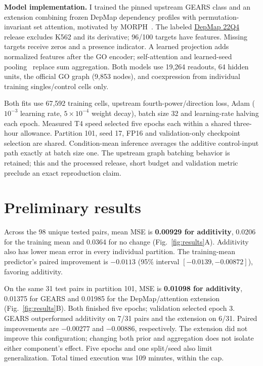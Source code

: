 \documentclass[11pt,letterpaper]{article}
\begin{document}
\textbf{Model implementation.} I trained the pinned upstream GEARS class and an extension combining frozen DepMap dependency profiles with permutation-invariant set attention, motivated by MORPH~\cite{he2025}. The labeled \href{https://doi.org/10.6084/m9.figshare.21637199}{DepMap 22Q4} release excludes K562 and its derivative; 96/100 targets have features. Missing targets receive zeros and a presence indicator. A learned projection adds normalized features after the GO encoder; self-attention and learned-seed pooling~\cite{lee2019} replace sum aggregation. Both models use 19,264 readouts, 64 hidden units, the official GO graph (9,853 nodes), and coexpression from individual training singles/control cells only.

Both fits use 67,592 training cells, upstream fourth-power/direction loss, Adam ($10^{-3}$ learning rate, $5\times10^{-4}$ weight decay), batch size 32 and learning-rate halving each epoch. Measured T4 speed selected five epochs each within a shared three-hour allowance. Partition 101, seed 17, FP16 and validation-only checkpoint selection are shared. Condition-mean inference averages the additive control-input path exactly at batch size one. The upstream graph batching behavior is retained; this and the processed release, short budget and validation metric preclude an exact reproduction claim.

\section{Preliminary results}
Across the 98 unique tested pairs, mean MSE is \textbf{0.00929 for additivity}, 0.0206 for the training mean and 0.0364 for no change (Fig.~\ref{fig:results}A). Additivity also has lower mean error in every individual partition. The training-mean predictor's paired improvement is $-0.0113$ (95\% interval $[-0.0139,-0.00872]$), favoring additivity.

On the same 31 test pairs in partition 101, MSE is \textbf{0.01098 for additivity}, 0.01375 for GEARS and 0.01985 for the DepMap/attention extension (Fig.~\ref{fig:results}B). Both finished five epochs; validation selected epoch 3. GEARS outperformed additivity on 7/31 pairs and the extension on 6/31. Paired improvements are $-0.00277$ and $-0.00886$, respectively. The extension did not improve this configuration; changing both prior and aggregation does not isolate either component's effect. Five epochs and one split/seed also limit generalization. Total timed execution was 109 minutes, within the cap.
\end{document}
